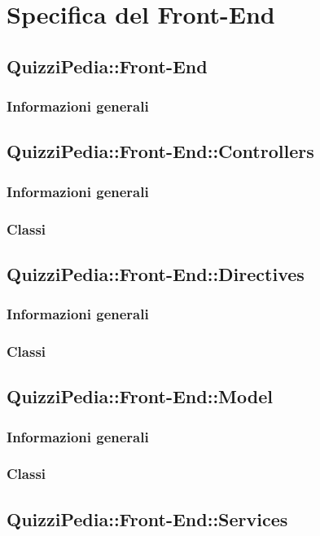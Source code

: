 \newpage
\section{Specifica del Front-End}
\subsection{QuizziPedia::Front-End}
\subsubsection{Informazioni generali}

\subsection{QuizziPedia::Front-End::Controllers}
\subsubsection{Informazioni generali}
\subsubsection{Classi}

\subsection{QuizziPedia::Front-End::Directives}
\subsubsection{Informazioni generali}
\subsubsection{Classi}

\subsection{QuizziPedia::Front-End::Model}
\subsubsection{Informazioni generali}
\subsubsection{Classi}

\subsection{QuizziPedia::Front-End::Services}
